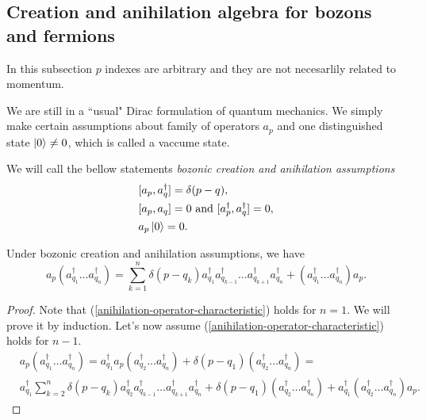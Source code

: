 \documentclass[main.tex]{subfiles}
\begin{document}
\subsection{Creation and anihilation algebra for bozons and fermions}
In this subsection $p$ indexes are arbitrary and they are not necesarlily related to momentum. 

We are still in a ``usual" Dirac formulation of quantum mechanics. We simply make certain assumptions about family of operators $a_p$ and one distinguished state    $\ket{0} \not= 0$, which is called a vaccume state.

\begin{definition}
We will call the bellow statements \textit{bozonic creation and anihilation assumptions}
\begin{align}
& [a_p, a^\dagger_q] = \delta(p - q),\\
& [a_p, a_q] = 0 \text{ and } [a^\dagger_p, a^\dagger_q] = 0,\\
& a_p\ket{0} = 0.
\end{align}
\end{definition}

\begin{proposition}
Under bozonic creation and anihilation assumptions, we have
\begin{equation}
\label{anihilation-operator-characteristic}
a_p (a_{q_1}^\dagger \dots a_{q_n}^\dagger) = \sum_{k=1}^n\delta(p - q_k) a_{q_1}^\dagger a_{q_{k - 1}}^\dagger \dots a_{q_{k + 1}}^\dagger a_{q_n}^\dagger + (a_{q_1}^\dagger \dots a_{q_n}^\dagger)a_p.
\end{equation}
\end{proposition}
\begin{proof}
Note that (\ref{anihilation-operator-characteristic}) holds for $n = 1$. We will prove it by induction. Let's now assume (\ref{anihilation-operator-characteristic}) holds for $n - 1$.
\begin{align*}
& a_p (a_{q_1}^\dagger \dots a_{q_n}^\dagger)=
a_{q_1}^\dagger a_p (a_{q_2}^\dagger \dots a_{q_n}^\dagger) + \delta(p - q_1) (a_{q_2}^\dagger \dots a_{q_n}^\dagger)= \\
& a_{q_1}^\dagger\sum_{k=2}^n\delta(p - q_k) a_{q_2}^\dagger a_{q_{k - 1}}^\dagger \dots a_{q_{k + 1}}^\dagger a_{q_n}^\dagger + \delta(p - q_1) (a_{q_2}^\dagger \dots a_{q_n}^\dagger) + a_{q_1}^\dagger (a_{q_2}^\dagger \dots a_{q_n}^\dagger)a_p.
\end{align*} 
\end{proof}
\end{document}
